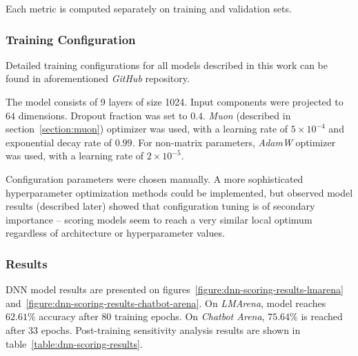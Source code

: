 \documentclass[a4paper,11pt,twoside]{report}
\theoremstyle{definition}
\begin{document}
Each metric is computed separately on training and validation sets.

\subsubsection{Training Configuration}
\label{section:dnn-training-config}

Detailed training configurations for all models described in this work can be found in aforementioned \textit{GitHub} repository.

The model consists of 9 layers of size 1024. Input components were projected to $64$ dimensions. Dropout fraction was set to $0.4$. \textit{Muon} (described in section~\ref{section:muon}) optimizer was used, with a learning rate of $5 \times 10^{-4}$ and exponential decay rate of $0.99$. For non-matrix parameters, \textit{AdamW} optimizer was used, with a learning rate of $2 \times 10^{-5}$.

Configuration parameters were chosen manually. A more sophisticated hyperparameter optimization methods could be implemented, but observed model results (described later) showed that configuration tuning is of secondary importance -- scoring models seem to reach a very similar local optimum regardless of architecture or hyperparameter values.

\subsubsection{Results}

DNN model results are presented on figures~\ref{figure:dnn-scoring-results-lmarena} and~\ref{figure:dnn-scoring-results-chatbot-arena}. On \textit{LMArena}, model reaches $62.61 \%$ accuracy after 80 training epochs. On \textit{Chatbot Arena}, $75.64 \%$ is reached after 33 epochs. Post-training sensitivity analysis results are shown in table~\ref{table:dnn-scoring-results}.
\end{document}
